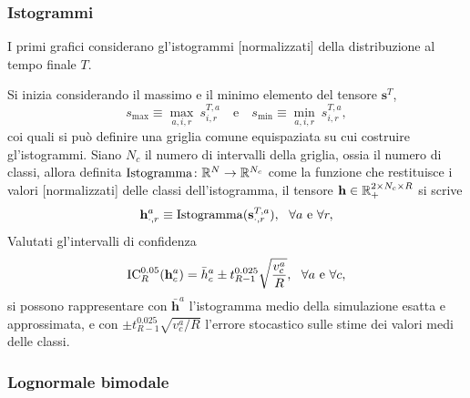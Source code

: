             \subsubsection{Istogrammi}

                I primi grafici considerano gl'istogrammi [normalizzati] della distribuzione al tempo finale \(T\).
                
                Si inizia considerando il massimo e il minimo elemento del tensore \(\mathbf s^T\),
                \begin{equation*}
                    s_{\max}\equiv\max_{a,i,r}\ s^{T,a}_{i,r}
                    \quad\text{e}\quad
                    s_{\min}\equiv\min_{a,i,r}\ s^{T,a}_{i,r},
                \end{equation*}
                coi quali si può definire una griglia comune equispaziata su cui costruire gl'istogrammi. Siano \(N_c\) il numero di intervalli della griglia, ossia il numero di classi, allora definita \(\operatorname{Istogramma}\colon\mathbb R^N\to\mathbb R^{N_c}\) come la funzione che restituisce i valori [normalizzati] delle classi dell'istogramma, il tensore \(\mathbf h\in\mathbb R_+^{2\times N_c\times R}\) si scrive
                \begin{equation*}
                    \mathbf h^a_{\cdot,r}\equiv\operatorname{Istogramma}(\mathbf s^{T,a}_{\cdot,r}),
                    \ \ \forall a\text{ e }\forall r,
                \end{equation*}
                Valutati gl'intervalli di confidenza
                \begin{equation*}
                    \operatorname{IC}_R^{0.05}(\mathbf h^a_c)=
                    \bar h^a_c\pm t^{0.025}_{R-1}\sqrt{\frac{v^a_c}R},
                    \ \ \forall a\text{ e }\forall c,
                \end{equation*}
                si possono rappresentare con \(\bar{\mathbf h}^a\) l'istogramma medio della simulazione esatta e approssimata, e con \(\pm t^{0.025}_{R-1}\sqrt{v^a_c/R}\) l'errore stocastico sulle stime dei valori medi delle classi.

            \subsubsection{Lognormale bimodale}

